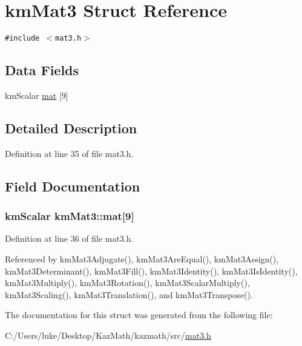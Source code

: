 \hypertarget{structkm_mat3}{
\section{kmMat3 Struct Reference}
\label{structkm_mat3}
}
{\tt \#include $<$mat3.h$>$}

\subsection*{Data Fields}
\begin{CompactItemize}
\item 
kmScalar \hyperlink{structkm_mat3_e62896cf1c8f7a94e7a18dede8480125}{mat} \mbox{[}9\mbox{]}
\end{CompactItemize}


\subsection{Detailed Description}


Definition at line 35 of file mat3.h.

\subsection{Field Documentation}
\hypertarget{structkm_mat3_e62896cf1c8f7a94e7a18dede8480125}{
\subsubsection[{mat}]{\setlength{\rightskip}{0pt plus 5cm}kmScalar {\bf kmMat3::mat}\mbox{[}9\mbox{]}}}
\label{structkm_mat3_e62896cf1c8f7a94e7a18dede8480125}




Definition at line 36 of file mat3.h.

Referenced by kmMat3Adjugate(), kmMat3AreEqual(), kmMat3Assign(), kmMat3Determinant(), kmMat3Fill(), kmMat3Identity(), kmMat3IsIdentity(), kmMat3Multiply(), kmMat3Rotation(), kmMat3ScalarMultiply(), kmMat3Scaling(), kmMat3Translation(), and kmMat3Transpose().

The documentation for this struct was generated from the following file:\begin{CompactItemize}
\item 
C:/Users/luke/Desktop/KazMath/kazmath/src/\hyperlink{mat3_8h}{mat3.h}\end{CompactItemize}
